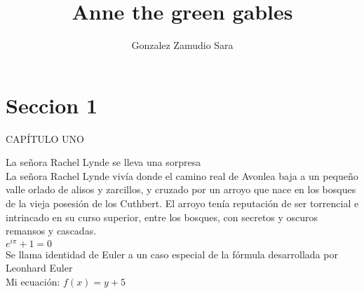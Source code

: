 \documentclass[a4paper,10pt]{article}
\title{Anne the green gables} %
\author{Gonzalez Zamudio Sara} %
\begin{document}
\maketitle

% 

\section{Seccion 1}

CAPÍTULO UNO

La señora Rachel Lynde se lleva una sorpresa \\ %

La señora Rachel Lynde vivía donde el camino real de Avonlea baja a un
pequeño valle orlado de alisos y zarcillos, y cruzado por un arroyo que nace en
los bosques de la vieja posesión de los Cuthbert. El arroyo tenía reputación de
ser torrencial e intrincado en su curso superior, entre los bosques, con secretos
y oscuros remansos y cascadas.\\ %


$ e^{i \pi} + 1 = 0 $ \\ %
Se llama identidad de Euler a un caso especial de la fórmula desarrollada por Leonhard Euler\\

 
Mi ecuación:
$f(x)=y+5$
\end{document}
